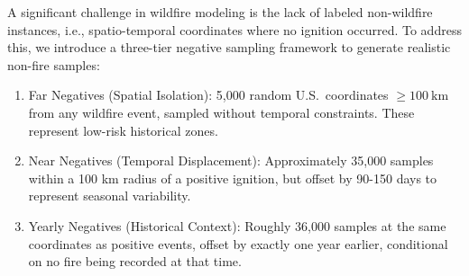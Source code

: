 \documentclass[conference]{IEEEtran}
\begin{document}


A significant challenge in wildfire modeling is the lack of labeled non-wildfire instances, i.e., spatio-temporal coordinates where no ignition occurred. To address this, we introduce a three-tier negative sampling framework to generate realistic non-fire samples:

\begin{enumerate}
    \item Far Negatives (Spatial Isolation): 5,000 random U.S.\ coordinates \(\geq 100~\mathrm{km}\) from any wildfire event, sampled without temporal constraints. These represent low-risk historical zones.
    \item Near Negatives (Temporal Displacement): Approximately 35,000 samples within a 100 km radius of a positive ignition, but offset by 90-150 days to represent seasonal variability.
    \item Yearly Negatives (Historical Context): Roughly 36,000 samples at the same coordinates as positive events, offset by exactly one year earlier, conditional on no fire being recorded at that time.
\end{enumerate}
\end{document}
